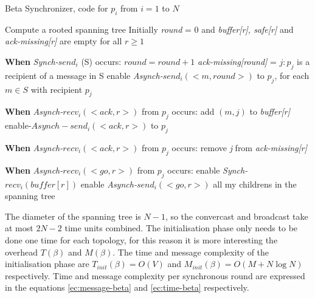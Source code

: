 \begin{algorithm}
 \caption{Beta Synchronizer, code for $p_i$ from $i = 1$ to $N$}
 \label{algorithm:beta} 

\SetAlgoNoLine

Compute a rooted spanning tree
Initially \textit{round} = 0 and \newline
\textit{buffer[r], safe[r]} and \textit{ack-missing[r]} are empty for all $r \geq 1$ \newline

\textbf{When} \textit{Synch-}$send_i$ (S) occurs:\newline
$round = round + 1$ \newline
\textit{ack-missing[round]} = {$j:p_j$ is a recipient of a message in S} \newline
enable \textit{Asynch-}$send_i(<m,round>)$  to $p_j$, for each $m \in S$ with recipient $p_j$ \newline

\textbf{When} \textit{Asynch-}$recv_i(<ack,r>)$ from $p_j$ occurs: \newline
add $(m,j)$ to \textit{buffer[r]} \newline
enable-$Asynch-send_i(<ack,r>)$ to $p_j$ \newline

\textbf{When} \textit{Asynch-}$recv_i(<ack,r>)$ from $p_j$ occurs: \newline
remove \textit{j} from \textit{ack-missing[r]} \newline
{}

\textbf{When} \textit{Asynch-}$recv_i(<go,r>)$ from $p_j$ occurs: \newline
  enable \textit{Synch-}$recv_i(buffer[r])$ \newline
  enable \textit{Asynch-}$send_i(<go,r>)$ all my childrens in the spanning tree \newline

\end{algorithm}

The diameter of the spanning tree is $N - 1$, so the convercast and broadcast take at most $2N - 2$ time units combined. The initialisation phase only needs to be done one time for each topology, for this reason it is more interesting the overhead $T(\beta)$ and $M(\beta)$. The time and message complexity of the initialisation phase are $T_{init}(\beta) = O(V)$ and $M_{init}(\beta) = O(M + N \log N)$  respectively. Time and message  complexity per synchronous round are expressed in the equations \ref{ec:message-beta} and \ref{ec:time-beta} respectively.

